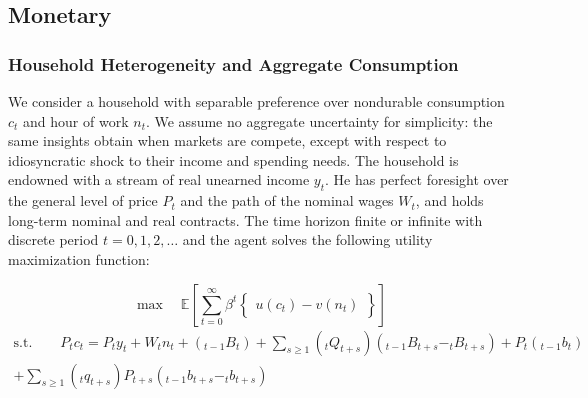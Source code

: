 \documentclass[11pt,letterpaper]{article}
\begin{document}
\subsection{Monetary}
\subsubsection{Household Heterogeneity and Aggregate Consumption}

We consider a household with separable preference over nondurable consumption $c_{t}$ and hour of work $n_{t}$. We assume no aggregate uncertainty for simplicity: the same insights obtain when markets are compete, except with respect to idiosyncratic shock to their income and spending needs. The household is endowned with a stream of real unearned income $y_{t}$. He has perfect foresight over the general level of price $P_{t}$ and the path of the nominal wages $W_{t}$, and holds long-term nominal and real contracts. The time horizon finite or infinite with discrete period $t= 0, 1, 2, \ldots$ and the agent solves the following utility maximization function:  

\begin{equation*}
	\max \quad \mathbb{E} \left[\sum_{t=0}^{\infty}\beta^{t}\begin{Bmatrix}u (c_{t}) - v(n_{t})\end{Bmatrix}\right]
\end{equation*}
\begin{equation}\begin{split}\label{e1}
	\text{s.t.} \quad \quad P_{t}c_{t} = P_{t}y_{t} + W_{t}n_{t} + (_{t-1}B_{t}) + \sum_{s \geqslant 1}(_{t}Q_{t+s})(_{t-1}B_{t+s} - _{t}B_{t+s}) + P_{t}(_{t-1}b_{t}) \\
	+ \sum_{s \geqslant 1}(_{t}q_{t+s}) P_{t+s} (_{t-1}b_{t+s} - _{t}b_{t+s})
\end{split}\end{equation}
\end{document}
